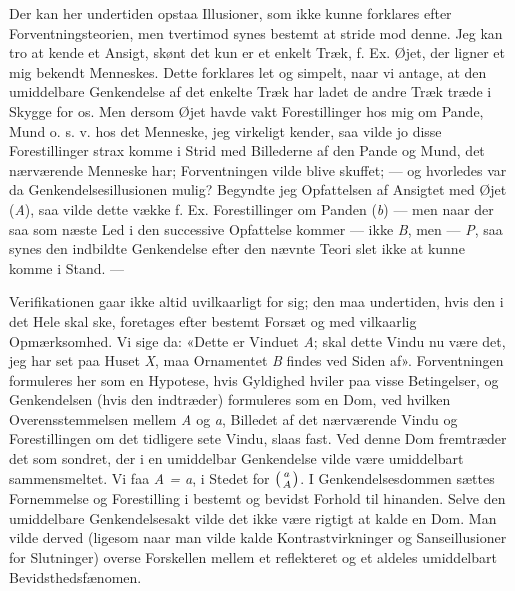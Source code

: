 \documentclass[12pt,a4paper,openany]{book}
\newcommand{\opage}[1]{\marginnote{\footnotesize\textit{[#1]}}}
\begin{document}
Der kan her undertiden opstaa Illusioner, som ikke kunne forklares efter
Forventningsteorien, men tvertimod synes bestemt at stride mod denne. Jeg kan
tro at kende et Ansigt, skønt det kun er et enkelt Træk, f. Ex. Øjet, der
ligner et mig bekendt Menneskes. Dette forklares let og simpelt, naar vi
antage, at den umiddelbare Genkendelse af det enkelte Træk har ladet de andre
Træk træde i Skygge for os. Men dersom Øjet havde vakt Forestillinger hos mig
om Pande, Mund o. s. v. hos det Menneske, jeg virkeligt kender, saa vilde jo
disse Forestillinger strax komme i Strid med Billederne af den Pande og Mund,
det nærværende Menneske har; Forventningen vilde blive skuffet; --- og
hvorledes var da Genkendelsesillusionen mulig? Begyndte jeg Opfattelsen af
Ansigtet med Øjet (\textit{A}), saa vilde dette vække f. Ex. Forestillinger om
Panden (\textit{b}) --- men naar der saa som næste Led i den successive
Opfattelse kommer --- ikke \textit{B}, men --- \textit{P}, saa synes den
indbildte Genkendelse efter den nævnte Teori slet ikke at kunne komme i Stand. ---

Verifikationen gaar ikke altid uvilkaarligt for sig; den maa undertiden, hvis
den i det Hele skal ske, foretages efter bestemt Forsæt og med vilkaarlig
Opmærksomhed. Vi sige da: «Dette er Vinduet \textit{A}; skal dette Vindu nu
være det, jeg har set paa Huset \textit{X}, maa Ornamentet \textit{B} findes
ved Siden af». Forventningen formuleres her som en Hypotese,
\setcounter{footnote}{0}%
\opage{21}hvis Gyldighed hviler paa visse Betingelser, og Genkendelsen (hvis
den indtræder) formuleres som en Dom, ved hvilken Overensstemmelsen mellem
\textit{A} og\textit{ a}, Billedet af det nærværende Vindu og Forestillingen om
det tidligere sete Vindu, slaas fast. Ved denne Dom fremtræder det som sondret,
der i en umiddelbar Genkendelse vilde være umiddelbart sammensmeltet. Vi faa
\textit{A = a}, i Stedet for $\left({a\atop A}\right)$. I Genkendelsesdommen
sættes Fornemmelse og Forestilling i bestemt og bevidst Forhold til hinanden.
Selve den umiddelbare Genkendelsesakt vilde det ikke være rigtigt at kalde en
Dom. Man vilde derved (ligesom naar man vilde kalde Kontrastvirkninger og
Sanseillusioner for Slutninger) overse Forskellen mellem et reflekteret og et
aldeles umiddelbart Bevidsthedsfænomen.
\end{document}

